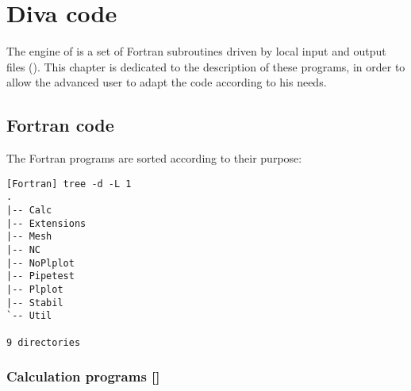 \chapter[Diva code]{Diva code}
\hypertarget{DIVACODE}{}

The engine of \diva is a set of Fortran subroutines driven by local input and output files ().
This chapter is dedicated to the description of these programs, in order to allow the advanced user to adapt the code according to his needs.

\minitoc


\section[Fortran code]{Fortran code \expert}

The Fortran programs are sorted according to their purpose: 

\begin{lstlisting}[style=Bash]
[Fortran] tree -d -L 1
.
|-- Calc
|-- Extensions
|-- Mesh
|-- NC
|-- NoPlplot
|-- Pipetest
|-- Plplot
|-- Stabil
`-- Util

9 directories
\end{lstlisting}

\subsection[Calculation programs]{Calculation programs []}

